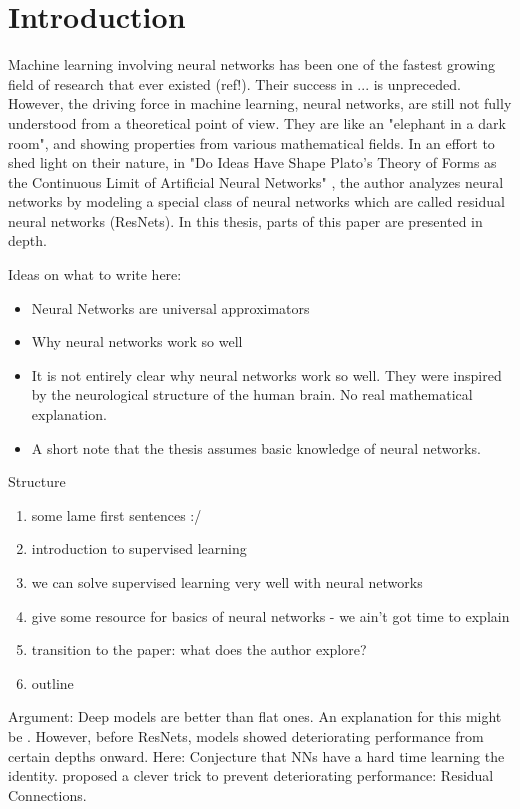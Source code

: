\section{Introduction}

Machine learning involving neural networks has been one of the fastest growing field of research that ever existed (ref!).
Their success in ... is unpreceded.
However, the driving force in machine learning, neural networks, are still not fully understood from a theoretical point of view.
They are like an "elephant in a dark room", and showing properties from various mathematical fields.
In an effort to shed light on their nature, in "Do Ideas Have Shape Plato's Theory of Forms as the Continuous Limit of Artificial Neural Networks" \cite{owhadi20}, the author analyzes neural networks by modeling a special class of neural networks which are called residual neural networks (ResNets).
In this thesis, parts of this paper are presented in depth.

Ideas on what to write here:
\begin{itemize}
	\item Neural Networks are universal approximators
	\item Why neural networks work so well \cite{lin17}
	\item It is not entirely clear why neural networks work so well. 
	They were inspired by the neurological structure of the human brain.
	No real mathematical explanation.
	\item A short note that the thesis assumes basic knowledge of neural networks.
\end{itemize}
Structure
\begin{enumerate}
	\item some lame first sentences :/
	\item introduction to supervised learning
	\item we can solve supervised learning very well with neural networks
	\item give some resource for basics of neural networks - we ain't got time to explain
	\item transition to the paper: what does the author explore?
	\item outline
\end{enumerate}

Argument:
Deep models are better than flat ones. An explanation for this might be \cite{lin17}.
However, before ResNets, models showed deteriorating performance from certain depths onward.
Here: Conjecture that NNs have a hard time learning the identity.
\cite{he16} proposed a clever trick to prevent deteriorating performance:
Residual Connections.

